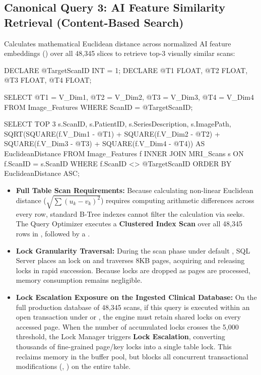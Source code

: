 \subsection{Canonical Query 3: AI Feature Similarity Retrieval (Content-Based Search)}
Calculates mathematical Euclidean distance across normalized AI feature embeddings () over all 48,345 slices to retrieve top-3 visually similar scans:
\begin{SQLCode}
DECLARE @TargetScanID INT = 1;
DECLARE @T1 FLOAT, @T2 FLOAT, @T3 FLOAT, @T4 FLOAT;

SELECT @T1 = V_Dim1, @T2 = V_Dim2, @T3 = V_Dim3, @T4 = V_Dim4 
FROM Image_Features WHERE ScanID = @TargetScanID;

SELECT TOP 3 s.ScanID, s.PatientID, s.SeriesDescription, s.ImagePath,
    SQRT(SQUARE(f.V_Dim1 - @T1) + SQUARE(f.V_Dim2 - @T2) + 
         SQUARE(f.V_Dim3 - @T3) + SQUARE(f.V_Dim4 - @T4)) AS EuclideanDistance
FROM Image_Features f
INNER JOIN MRI_Scans s ON f.ScanID = s.ScanID
WHERE f.ScanID <> @TargetScanID
ORDER BY EuclideanDistance ASC;
\end{SQLCode}

\begin{itemize}
    \item \textbf{Full Table Scan Requirements:} Because calculating non-linear Euclidean distance ($\sqrt{\sum (u_k - v_k)^2}$) requires computing arithmetic differences across every row, standard B-Tree indexes cannot filter the calculation via seeks. The Query Optimizer executes a \textbf{Clustered Index Scan} over all 48,345 rows in , followed by a .
    \item \textbf{Lock Granularity Traversal:} During the scan phase under default , SQL Server places an  lock on  and traverses 8KB pages, acquiring and releasing  locks in rapid succession. Because locks are dropped as pages are processed, memory consumption remains negligible.
    \item \textbf{Lock Escalation Exposure on the Ingested Clinical Database:} On the full production database of 48,345 scans, if this query is executed within an open transaction under  or , the engine must retain shared locks on every accessed page. When the number of accumulated locks crosses the 5,000 threshold, the Lock Manager triggers \textbf{Lock Escalation}, converting thousands of fine-grained page/key locks into a single \textbf{} table lock. This reclaims memory in the buffer pool, but blocks all concurrent transactional modifications (, ) on the entire  table.
\end{itemize}

